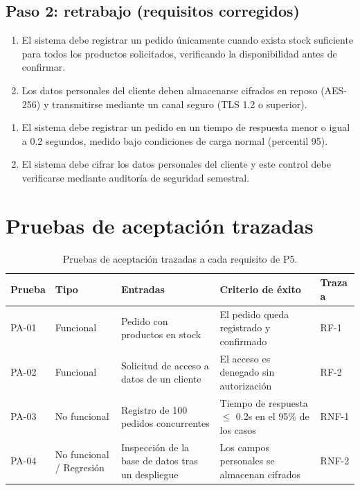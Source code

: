 \documentclass[11pt,a4paper]{article}
\begin{document}
\subsection*{Paso 2: retrabajo (requisitos corregidos)}
\begin{enumerate}[label=\textbf{RF-\arabic*'}]
    \item El sistema debe registrar un pedido únicamente cuando exista stock suficiente para todos los productos solicitados, verificando la disponibilidad antes de confirmar.
    \item Los datos personales del cliente deben almacenarse cifrados en reposo (AES-256) y transmitirse mediante un canal seguro (TLS 1.2 o superior).
\end{enumerate}
\begin{enumerate}[label=\textbf{RNF-\arabic*'}]
    \item El sistema debe registrar un pedido en un tiempo de respuesta menor o igual a 0.2 segundos, medido bajo condiciones de carga normal (percentil 95).
    \item El sistema debe cifrar los datos personales del cliente y este control debe verificarse mediante auditoría de seguridad semestral.
\end{enumerate}

\FloatBarrier

\section{Pruebas de aceptación trazadas}

\begin{table}[H]
\centering
\small
\begin{tabular}{l l L{3.2cm} L{3.2cm} l}
\toprule
\textbf{Prueba} & \textbf{Tipo} & \textbf{Entradas} & \textbf{Criterio de éxito} & \textbf{Traza a} \\
\midrule
PA-01 & Funcional      & Pedido con productos en stock              & El pedido queda registrado y confirmado & RF-1 \\
PA-02 & Funcional      & Solicitud de acceso a datos de un cliente  & El acceso es denegado sin autorización  & RF-2 \\
PA-03 & No funcional   & Registro de 100 pedidos concurrentes       & Tiempo de respuesta $\leq$ 0.2s en el 95\% de los casos & RNF-1 \\
PA-04 & No funcional / Regresión & Inspección de la base de datos tras un despliegue & Los campos personales se almacenan cifrados & RNF-2 \\
\bottomrule
\end{tabular}
\caption{Pruebas de aceptación trazadas a cada requisito de P5.}
\end{table}

\FloatBarrier
\end{document}
